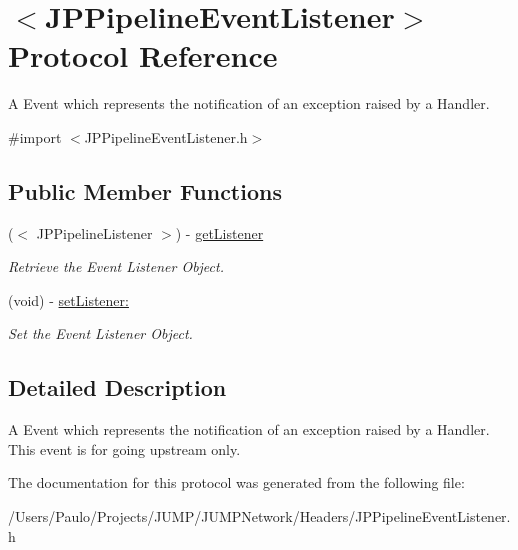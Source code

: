 \hypertarget{a00025}{
\section{$<$JPPipelineEventListener$>$ Protocol Reference}
\label{a00025}
}


A Event which represents the notification of an exception raised by a Handler.  




{\ttfamily \#import $<$JPPipelineEventListener.h$>$}

\subsection*{Public Member Functions}
\begin{DoxyCompactItemize}
\item 
\hypertarget{a00025_ab3f9aeae896ed993f51ecc1a9926bfc5}{
($<$ JPPipelineListener $>$) -\/ \hyperlink{a00025_ab3f9aeae896ed993f51ecc1a9926bfc5}{getListener}}
\label{a00025_ab3f9aeae896ed993f51ecc1a9926bfc5}

\begin{DoxyCompactList}\small\item\em Retrieve the Event Listener Object. \item\end{DoxyCompactList}\item 
\hypertarget{a00025_ad2a009d33860cbba56cbe01930191dda}{
(void) -\/ \hyperlink{a00025_ad2a009d33860cbba56cbe01930191dda}{setListener:}}
\label{a00025_ad2a009d33860cbba56cbe01930191dda}

\begin{DoxyCompactList}\small\item\em Set the Event Listener Object. \item\end{DoxyCompactList}\end{DoxyCompactItemize}


\subsection{Detailed Description}
A Event which represents the notification of an exception raised by a Handler. This event is for going upstream only. 

The documentation for this protocol was generated from the following file:\begin{DoxyCompactItemize}
\item 
/Users/Paulo/Projects/JUMP/JUMPNetwork/Headers/JPPipelineEventListener.h\end{DoxyCompactItemize}
